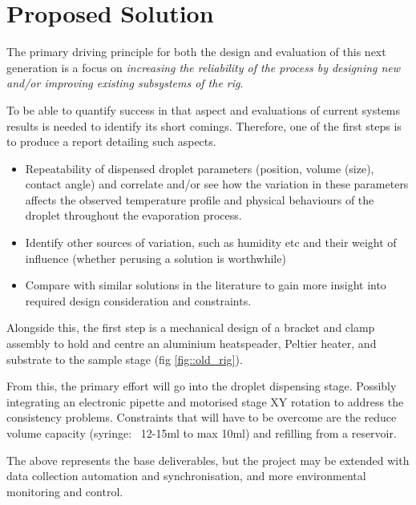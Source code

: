 \documentclass[11pt, a4paper, twoside, openright]{report}
\begin{document}
\newpage
\section{Proposed Solution}
The primary driving principle for both the design and evaluation of this next generation is a focus on \textit{increasing the reliability of the process by designing new and/or improving existing subsystems of the rig}. 

To be able to quantify success in that aspect and evaluations of current systems results is needed to  identify its short comings. Therefore, one of the first steps is to produce a report detailing such aspects.
\begin{itemize}
  \item Repeatability of dispensed droplet parameters (position, volume (size), contact angle) and correlate and/or see how the variation in these parameters affects the observed temperature profile and physical behaviours of the droplet throughout the evaporation process.
  \item Identify other sources of variation, such as humidity etc and their weight of influence (whether perusing a solution is worthwhile)
  \item Compare with similar solutions in the literature to gain more insight into required design consideration and constraints.
\end{itemize}

Alongside this, the first step is a mechanical design of a bracket and clamp assembly to hold and centre an aluminium heatspeader, Peltier heater, and substrate to the sample stage (fig \ref{fig::old_rig}).

From this, the primary effort will go into the droplet dispensing stage. Possibly integrating an electronic pipette and motorised stage XY  rotation to address the consistency problems. Constraints that will have to be overcome are the reduce volume capacity (syringe: ~12-15ml to max 10ml) and refilling from a reservoir.

The above represents the base deliverables, but the project may be extended with data collection automation and synchronisation, and more environmental monitoring and control.
\end{document}
